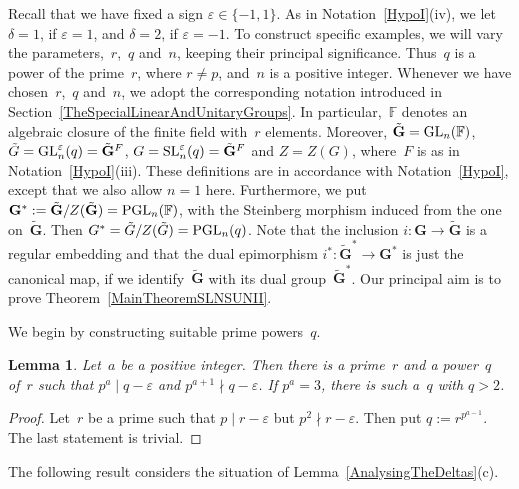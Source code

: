 \documentclass[12pt]{amsart}
\newcommand{\bG}{{\mathbf{G}}}      %
\def\GL{ \text{\rm GL} }
\def\SL{ \text{\rm SL} }
\def\PGL{ \text{\rm PGL} }
\newtheorem{lem}[thm]{Lemma}
\theoremstyle{theorem}
\theoremstyle{definition}
\theoremstyle{remark}
\begin{document}
Recall that we have fixed a sign $\varepsilon \in \{ -1, 1\}$. As in
Notation~\ref{HypoI}(iv), we let $\delta = 1$, if $\varepsilon = 1$, and 
$\delta = 2$, if $\varepsilon = -1$.  To construct specific examples, we will 
vary the parameters,~$r$,~$q$ and~$n$, keeping their principal significance. 
Thus~$q$ is a power of the prime~$r$, where $r \neq p$, and~$n$ is a positive 
integer.  Whenever we have chosen~$r$,~$q$ and~$n$, we adopt the corresponding 
notation introduced in Section~\ref{TheSpecialLinearAndUnitaryGroups}. 
In particular,~$\mathbb{F}$ denotes an
algebraic closure of the finite field with~$r$ elements. Moreover,
$\tilde{\bG} = \GL_n( \mathbb{F} )$, $\tilde{G} = \GL_n^{\varepsilon}( q ) 
= \tilde{\bG}^F$, $G = \SL_n^{\varepsilon}(q) = \tilde{\bG}^F$ and 
$Z = Z( G )$, where~$F$ is as in Notation~\ref{HypoI}(iii). These definitions 
are in accordance with Notation~\ref{HypoI}, except that we also allow $n = 1$ 
here. Furthermore, we put 
$\bG^* := \tilde{\bG}/Z( \tilde{\bG} ) = \PGL_n( \mathbb{F} )$,
with the Steinberg morphism induced from the one on~$\tilde{\bG}$. Then
$G^* = \tilde{G}/Z( \tilde{G} ) = \PGL_n( q )$. Note that the inclusion
$i: \bG \rightarrow \tilde{\bG}$ is a regular embedding and that the dual
epimorphism $i^* : \tilde{\bG}^* \rightarrow \bG^*$ is just the canonical
map, if we identify~$\tilde{\bG}$ with its dual group~$\tilde{\bG}^*$.
Our principal aim is to prove Theorem~\ref{MainTheoremSLNSUNII}.

We begin by constructing suitable prime powers~$q$.

\begin{lem}
\label{ExistenceOfQ}
Let~$a$ be a positive integer. Then there is a prime~$r$ and a power~$q$ of~$r$ 
such that $p^a \mid q - \varepsilon$ and $p^{a+1} \nmid q - \varepsilon$. If
$p^a = 3$, there is such a~$q$ with $q > 2$.
\end{lem}
\begin{proof}
Let~$r$ be a prime such that $p \mid r - \varepsilon$ but 
$p^2 \nmid r - \varepsilon$. Then put $q := r^{p^{a-1}}$. The last statement
is trivial.
\end{proof}

The following result considers the situation of 
Lemma~\ref{AnalysingTheDeltas}(c).
\end{document}
